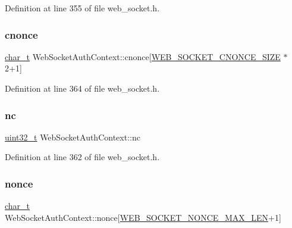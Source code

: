 Definition at line 355 of file web\+\_\+socket.\+h.

\mbox{\label{structWebSocketAuthContext_ab0845a2003e5f41154be669607a5e85c}} 
\subsubsection{\texorpdfstring{cnonce}{cnonce}}
{\footnotesize\ttfamily \hyperlink{compiler__port_8h_a40bb5262bf908c328fbcfbe5d29d0201}{char\+\_\+t} Web\+Socket\+Auth\+Context\+::cnonce\mbox{[}\hyperlink{web__socket_8h_a9a4f07ca6ff80b9ce6df8a8de49760e8}{W\+E\+B\+\_\+\+S\+O\+C\+K\+E\+T\+\_\+\+C\+N\+O\+N\+C\+E\+\_\+\+S\+I\+ZE} $\ast$2+1\mbox{]}}



Definition at line 364 of file web\+\_\+socket.\+h.

\mbox{\label{structWebSocketAuthContext_a23961b8af61e72b164bde15362baa8a5}} 
\subsubsection{\texorpdfstring{nc}{nc}}
{\footnotesize\ttfamily \hyperlink{stdint_8h_a435d1572bf3f880d55459d9805097f62}{uint32\+\_\+t} Web\+Socket\+Auth\+Context\+::nc}



Definition at line 362 of file web\+\_\+socket.\+h.

\mbox{\label{structWebSocketAuthContext_a76375cce9f84668fc50430de22dafc10}} 
\subsubsection{\texorpdfstring{nonce}{nonce}}
{\footnotesize\ttfamily \hyperlink{compiler__port_8h_a40bb5262bf908c328fbcfbe5d29d0201}{char\+\_\+t} Web\+Socket\+Auth\+Context\+::nonce\mbox{[}\hyperlink{web__socket_8h_a48d19c4a819af2a5c5b3fea833a7c7ea}{W\+E\+B\+\_\+\+S\+O\+C\+K\+E\+T\+\_\+\+N\+O\+N\+C\+E\+\_\+\+M\+A\+X\+\_\+\+L\+EN}+1\mbox{]}}



